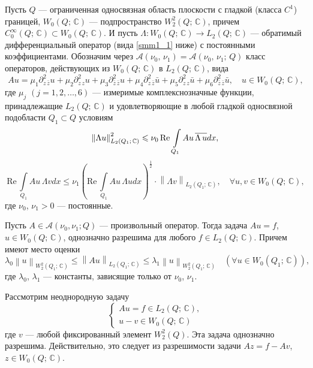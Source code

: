 Пусть $Q$  --- ограниченная односвязная область плоскости с гладкой
(класса $C^1$) границей, $W_0(Q;\, \mathbb{C})$ --- подпространство $W_2^2(Q;\, \mathbb{C})$,
причем $C_0^\infty(Q;\, \mathbb{C})\subset W_0(Q;\, \mathbb{C})$.
И пусть $\Lambda: W_0(Q;\, \mathbb{C})\to L_2(Q;\, \mathbb{C})$ ---
обратимый дифференциальный оператор (вида \eqref{smm1_1} ниже) с постоянными коэффициентами.
Обозначим через  $\mathcal{A}(\nu_0,\,\nu_1)=\mathcal{A}(\nu_0,\,\nu_1;\,Q)$
класс операторов, действующих из $W_0(Q;\, \mathbb{C})$ в $L_2(Q;\,\mathbb{C})$,  вида
 \begin{equation}\label{smm1_1}
     Au=\mu_1\partial_{z\,\bar{z}}^2 u+\mu_2\partial_{z\,z}^2 u+
  \mu_3\partial_{\bar{z}\,\bar{z}}^2 u +\mu_4\partial_{z\,\bar{z}}^2 \bar{u}+
  \mu_5\partial_{z\,z}^2 \bar{u}+\mu_6\partial_{\bar{z}\,\bar{z}}^2 \bar{u},\quad
  u\in W_0(Q;\,\mathbb{C}),
 \end{equation}
где $\mu_j$ $(j=1,2,\dots,6)$ --- измеримые комплекснозначные функции,
принадлежащие $L_2(Q;\,\mathbb{C})$ и удовлетворяющие в любой гладкой односвязной
подобласти $Q_1\subset Q$ условиям
 \begin{equation}\label{smm1_2}
      \left\|\Lambda u\right\|^2_{L_2(Q_1;\,\mathbb{C})}\leqslant \nu_0\,
      \text{Re}\, \int\limits_{Q_1}Au\, \overline{\Lambda\,u} dx,\\
 \end{equation}
\begin{equation}\label{smm1_3}
   \text{Re}\,\int\limits_{Q_1} Au\,\Lambda v dx\leqslant\nu_1 \left(\text{Re}\, \int\limits_{Q_1} Au\,
    \Lambda u dx\right)^{\frac12}\cdot \left\| \Lambda v\right\|_{L_2(Q_1;\,\mathbb{C})},\quad
\forall u,v\in W_0(Q;\,\mathbb{C}),
\end{equation}
где $\nu_0$, $\nu_1>0$ ---  постоянные.
\begin{theorem}  \label{smm1_teor1}
Пусть $A\in \mathcal{A}(\nu_0,\nu_1; Q)$ --- произвольный оператор. Тогда задача $Au=f$,
$u\in W_0(Q;\,\mathbb{C})$, однозначно разрешима для любого $f\in L_2(Q;\,\mathbb{C})$.
Причем имеют место оценки
$$
\lambda_0\left\| u\right\|_{W_2^2(Q_1;\,\mathbb{C})}\leqslant
 \left\| Au \right\|_{L_2(Q_1;\,\mathbb{C})} \leqslant
 \lambda_1 \left\| u\right\|_{W_2^2(Q_1;\,\mathbb{C})}
 \quad (\forall  u\in W_0(Q_1;\,\mathbb{C})) ,
$$
где $\lambda_0$, $\lambda_1$ --- константы, зависящие только от $\nu_0$, $\nu_1$.
\end{theorem}



Рассмотрим неоднородную задачу
$$
\left\{\begin{array}{l}
  Au=f\in L_2(Q;\,\mathbb{C}), \\[1mm]
u-v\in W_0(Q;\,\mathbb{C})
\end{array}\right.
    $$
где $v$ --- любой фиксированный элемент $W_2^2(Q)$.
Эта задача однозначно разрешима. Действительно, это
следует из разрешимости задачи $Az=f-Av$, $z\in W_0(Q;\,\mathbb{C})$.

